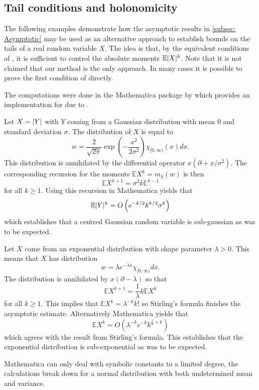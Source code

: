 \subsection{Tail conditions and holonomicity}
The following examples demonstrate how the asymptotic results in \cref{subsec: Asymptotic} may be used as an alternative approach to establish bounds on the tails of a real random variable $X$.
The idea is that, by the equivalent conditions of , it is sufficient to control the absolute moments $\mathbb{E}\vert X \vert^k$.
Note that it is not claimed that our method is the only approach.
In many cases it is possible to prove the first condition of  directly.

The computations were done in the Mathematica package by \cite{kauers2011mathematica} which provides an implementation for  due to \cite{birkhoff1933analytic}.
\begin{example}
  Let $X=\vert Y \vert$ with $Y$ coming from a Gaussian distribution with mean $0$ and standard deviation $\sigma$.
  The distribution of $X$ is equal to
  $$w = \frac{2}{\sqrt{2\pi}}\exp\left(-\frac{x^2}{2\sigma^2}\right)\chi_{[0,\infty)}(x)dx.$$
  This distribution is annihilated by the differential operator $x(\partial + x/\sigma^2).$
  The corresponding recursion for the moments $\mathbb{E}X^k = m_k(w)$ is then
  $$\mathbb{E}X^{k+1}= \sigma^2 k\mathbb{E}^{k-1} $$
  for all $k\geq 1$.
  Using this recursion in Mathematica yields that
  $$\mathbb{E}\vert Y \vert^{k} = O\left(e^{-k/2}k^{k/2}\sigma^k\right) $$
  which establishes that a centred Gaussian random variable is sub-gaussian as was to be expected.
\end{example}
\begin{example}
  Let $X$ come from an exponential distribution with shape parameter $\lambda>0$.
  This means that $X$ has distribution
  $$w =  \lambda e^{-\lambda x} \chi_{[0,\infty)} dx.$$
  The distribution is annihilated by $x(\partial - \lambda )$ so that
  $$\mathbb{E}X^{k+1}= \frac{1}{\lambda}k\mathbb{E}X^k$$
  for all $k\geq 1$.
  This implies that $\mathbb{E}X^k = \lambda^{-k}k!$ so Stirling's formula finishes the asymptotic estimate.
  Alternatively Mathematica yields that
  $$\mathbb{E}X^k = O(\lambda^{-k}e^{-k}k^{\frac{1}{2} + k}) $$
  which agrees with the result from Stirling's formula.
  This establishes that the exponential distribution is sub-exponential as was to be expected.
\end{example}
Mathematica can only deal with symbolic constants to a limited degree, the calculations break down for a normal distribution with both undetermined mean and variance.

